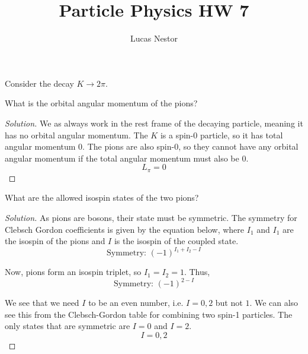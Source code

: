 \documentclass[12pt]{article}
\newenvironment{question}[2][Question]{\begin{trivlist}
\item[\hskip \labelsep {\bfseries #1}\hskip \labelsep {\bfseries #2.}]}{\end{trivlist}}
\newenvironment{questionpart}[2][Part]{\begin{trivlist}
\item[\hskip \labelsep \hskip \labelsep {\bfseries (#2)}]}{\end{trivlist}}
\newenvironment{solution}{\begin{proof}[Solution]}{\end{proof}}
\begin{document}
\title{Particle Physics HW 7}%
\author{Lucas Nestor}
 
\maketitle

\begin{question}{21.1}
Consider the decay $K\rightarrow2\pi$.
\end{question}

\begin{questionpart}{a}
What is the orbital angular momentum of the pions?
\end{questionpart}

\begin{solution}

We as always work in the rest frame of the decaying particle, meaning it has no orbital angular momentum. The $K$ is a spin-0 particle, so it has total angular momentum 0. The pions are also spin-0, so they cannot have any orbital angular momentum if the total angular momentum must also be 0.
\begin{equation*}
    \boxed{L_\pi=0}
\end{equation*}

\end{solution}

\begin{questionpart}{b}
What are the allowed isospin states of the two pions?
\end{questionpart}

\begin{solution}

As pions are bosons, their state must be symmetric. The symmetry for Clebsch Gordon coefficients is given by the equation below, where $I_1$ and $I_1$ are the isospin of the pions and $I$ is the isospin of the coupled state.
\begin{equation*}
    \text{Symmetry: }(-1)^{I_1+I_2-I}
\end{equation*}

Now, pions form an isospin triplet, so $I_1=I_2=1$. Thus,
\begin{equation*}
    \text{Symmetry: }(-1)^{2-I}
\end{equation*}

We see that we need $I$ to be an even number, i.e. $I=0,2$ but not $1$. We can also see this from the Clebsch-Gordon table for combining two spin-1 particles. The only states that are symmetric are $I=0$ and $I=2$.
\begin{equation*}
    \boxed{I=0,2}
\end{equation*}

\end{solution}
\end{document}
